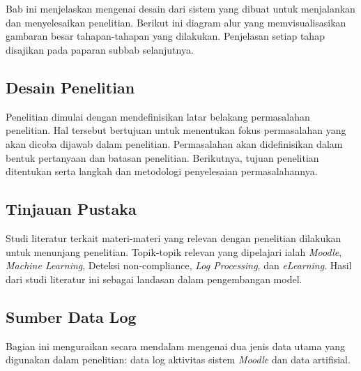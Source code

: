 \chapter{\babTiga}
\label{bab:3}
Bab ini menjelaskan mengenai desain dari sistem yang dibuat untuk menjalankan dan
menyelesaikan penelitian. Berikut ini diagram alur yang memvisualisasikan gambaran besar
tahapan-tahapan yang dilakukan. Penjelasan setiap tahap disajikan pada paparan subbab selanjutnya.

\section{Desain Penelitian}
\label{sec:desainPenelitian}
Penelitian dimulai dengan mendefinisikan latar belakang permasalahan penelitian. Hal tersebut bertujuan untuk menentukan fokus permasalahan yang akan dicoba dijawab dalam penelitian. Permasalahan akan didefinisikan dalam bentuk pertanyaan dan batasan penelitian. Berikutnya, tujuan penelitian ditentukan serta langkah dan metodologi penyelesaian permasalahannya.

\section{Tinjauan Pustaka}
\label{sec:tinjauanPustaka}
Studi literatur terkait materi-materi yang relevan dengan penelitian dilakukan untuk menunjang penelitian. Topik-topik relevan yang dipelajari ialah \textit{Moodle}, \textit{Machine Learning}, Deteksi non-compliance, \textit{Log Processing}, dan \textit{eLearning}. Hasil dari studi literatur ini sebagai landasan dalam pengembangan model.

\section{Sumber Data Log}
\label{sec:sumberDataLog}
Bagian ini menguraikan secara mendalam mengenai dua jenis data utama yang digunakan dalam penelitian: data log aktivitas sistem \textit{Moodle} dan data artifisial. 

